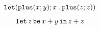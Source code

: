 \documentclass{article}
\begin{document}
\begin{displaymath}
    \letEx{\plusEx{x}{y}}{x}{\plusEx{z}{z}}
\end{displaymath}

\begin{displaymath}
    \letEx*{\plusEx*{x}{y}}{z}{\plusEx*{z}{z}}
\end{displaymath}
\end{document}
